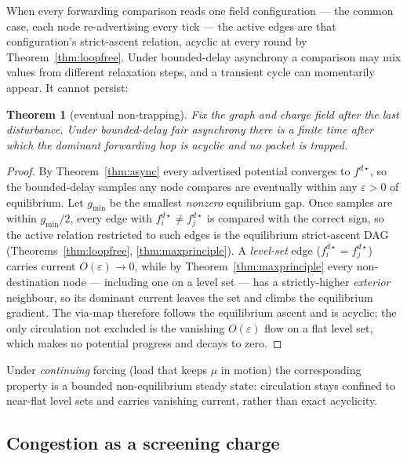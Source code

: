 \documentclass[11pt]{article}
\theoremstyle{plain}
\newtheorem{theorem}{Theorem}[section]
\numberwithin{equation}{section}
\begin{document}
When every forwarding comparison reads one field configuration — the common case, each node re-advertising every tick — the active edges are that configuration's strict-ascent relation, acyclic at every round by Theorem~\ref{thm:loopfree}. Under bounded-delay asynchrony a comparison may mix values from different relaxation steps, and a transient cycle can momentarily appear. It cannot persist:

\begin{theorem}[eventual non-trapping]\label{thm:nontrapping}
Fix the graph and charge field after the last disturbance. Under bounded-delay fair asynchrony there is a finite time after which the dominant forwarding hop is acyclic and no packet is trapped.
\end{theorem}
\begin{proof}
By Theorem~\ref{thm:async} every advertised potential converges to $f^{d\star}$, so the bounded-delay samples any node compares are eventually within any $\varepsilon>0$ of equilibrium. Let $g_{\min}$ be the smallest \emph{nonzero} equilibrium gap. Once samples are within $g_{\min}/2$, every edge with $f^{d\star}_i\neq f^{d\star}_j$ is compared with the correct sign, so the active relation restricted to such edges is the equilibrium strict-ascent DAG (Theorems~\ref{thm:loopfree}, \ref{thm:maxprinciple}). A \emph{level-set} edge ($f^{d\star}_i=f^{d\star}_j$) carries current $O(\varepsilon)\to 0$, while by Theorem~\ref{thm:maxprinciple} every non-destination node — including one on a level set — has a strictly-higher \emph{exterior} neighbour, so its dominant current leaves the set and climbs the equilibrium gradient. The via-map therefore follows the equilibrium ascent and is acyclic; the only circulation not excluded is the vanishing $O(\varepsilon)$ flow on a flat level set, which makes no potential progress and decays to zero.
\end{proof}

Under \emph{continuing} forcing (load that keeps $\mu$ in motion) the corresponding property is a bounded non-equilibrium steady state: circulation stays confined to near-flat level sets and carries vanishing current, rather than exact acyclicity.

\subsection{Congestion as a screening charge}\label{sec:congestion}
\end{document}
